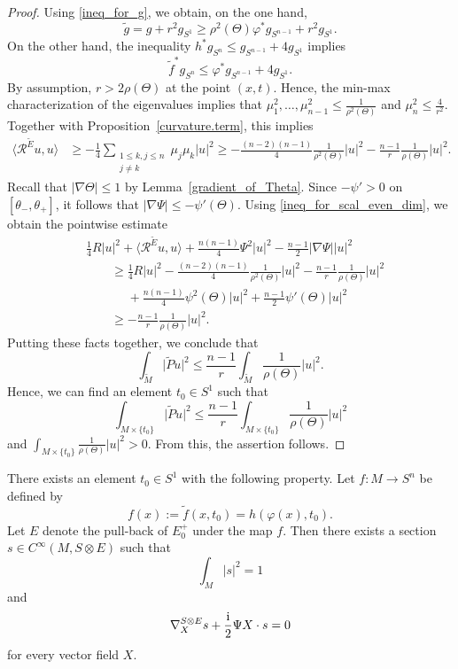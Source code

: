 \begin{proof}
Using \eqref{ineq_for_g}, we obtain, on the one hand,
\[
 \tilde{g} = g + r^2 g_{S^1} \geq \rho^2(\Theta) \varphi^* g_{S^{n-1}} + r^2 g_{S^1}.
 \]
On the other hand, the inequality $h^* g_{S^n} \leq g_{S^{n-1}} + 4 g_{S^1}$ implies
\[
 \tilde{f}^* g_{S^n} \leq \varphi^* g_{S^{n-1}} + 4 g_{S^1}.
\]
By assumption, $r > 2\rho(\Theta)$ at the point $(x,t)$. Hence, the min-max characterization of the eigenvalues implies that $\mu_1^2,\hdots,\mu_{n-1}^2 \leq \frac{1}{\rho^2(\Theta)}$ and $\mu_n^2 \leq \frac{4}{r^2}$.
Together with Proposition~\ref{curvature.term}, this implies
\begin{align*}
\big\langle \mathcal{R}^{\tilde{E}} u,u \big\rangle
&\geq -\frac{1}{4} \sum_{\substack{1\leq k,j\leq n\\ j \neq k}} \mu_j \mu_k |u|^2
\geq -\frac{(n-2)(n-1)}{4} \frac{1}{\rho^2(\Theta)} |u|^2 - \frac{n-1}{r} \frac{1}{\rho(\Theta)} |u|^2.
\end{align*}
Recall that $|\nabla \Theta| \leq 1$ by Lemma~\ref{gradient_of_Theta}.
Since $-\psi' > 0$ on $[\theta_-,\theta_+]$, it follows that $|\nabla \Psi| \leq -\psi'(\Theta)$.
Using \eqref{ineq_for_scal_even_dim}, we obtain the pointwise estimate
\begin{align*}
&\frac{1}{4} R |u|^2 + \big\langle \mathcal{R}^{\tilde{E}} u,u \big\rangle + \frac{n(n-1)}{4} \Psi^2 |u|^2 - \frac{n-1}{2} |\nabla \Psi| |u|^2 \\
&\qquad\geq \frac{1}{4} R |u|^2 - \frac{(n-2)(n-1)}{4} \frac{1}{\rho^2(\Theta)} |u|^2 - \frac{n-1}{r} \frac{1}{\rho(\Theta)} |u|^2\\
&\phantom{\qquad\geq }{}+ \frac{n(n-1)}{4} \psi^2(\Theta) |u|^2 + \frac{n-1}{2} \psi'(\Theta) |u|^2 \\
&\qquad\geq -\frac{n-1}{r} \frac{1}{\rho(\Theta)} |u|^2.
\end{align*}
Putting these facts together, we conclude that
\[
\int_{\tilde{M}} \big|\tilde{P} u\big|^2 \leq \frac{n-1}{r} \int_{\tilde{M}} \frac{1}{\rho(\Theta)} |u|^2.
\]
Hence, we can find an element $t_0 \in S^1$ such that
\[
\int_{M \times \{t_0\}} \big|\tilde{P} u\big|^2 \leq \frac{n-1}{r} \int_{M \times \{t_0\}} \frac{1}{\rho(\Theta)} |u|^2
\]
and $\int_{M \times \{t_0\}} \frac{1}{\rho(\Theta)} |u|^2 > 0$.
From this, the assertion follows.
\end{proof}


\begin{Corollary}
\label{limiting_spinor_even_dim}
There exists an element $t_0 \in S^1$ with the following property.
Let $f\colon M \to S^n$ be defined by
\[
 f(x) := \tilde{f}(x,t_0) = h(\varphi(x) ,t_0).
\]
Let $E$ denote the pull-back of $E_0^+$ under the map $f$.
Then there exists a section $s \in C^\infty(M,S \otimes E)$ such that
\[
 \int_M |s|^2 = 1
\]
and
\[
 \nabla_X^{S \otimes E} s + \frac{\rm i}{2} \Psi X \cdot s = 0
\]
for every vector field $X$.
\end{Corollary}

